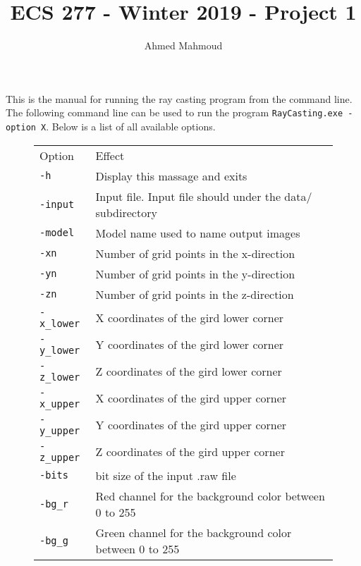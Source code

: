 \documentclass[12pt]{article}
\begin{document}
\title{ECS 277 - Winter 2019 - Project 1}
\author{Ahmed Mahmoud}
\date{} 

\maketitle

\newcommand{\cn}{Crank-Nicolson}

This is the manual for running the ray casting program from the command line. The following command line can be used to run the program  \texttt{RayCasting.exe -option X}. Below is a list of all available options. 
\vspace{5mm}

\begin{figure}[tbh]

  
\begin{tabular}{ |l| l|}
  \hline
  Option & Effect   \\ \hhline{|=|=|}
  \texttt{-h}  &  Display this massage and exits \\
  \texttt{-input}  &  Input file. Input file should under the \textsf{data/} subdirectory \\
  \texttt{-model}  &   Model name used to name output images \\
  \texttt{-xn}  &    Number of grid points in the x-direction \\
  \texttt{-yn}  &    Number of grid points in the y-direction \\
  \texttt{-zn}  &    Number of grid points in the z-direction \\
  \texttt{-x\_lower}  &     X coordinates of the gird lower corner \\
  \texttt{-y\_lower}  &     Y coordinates of the gird lower corner \\
  \texttt{-z\_lower}  &     Z coordinates of the gird lower corner \\
  \texttt{-x\_upper}  &      X coordinates of the gird upper corner \\  
  \texttt{-y\_upper}  &      Y coordinates of the gird upper corner \\  
  \texttt{-z\_upper}  &      Z coordinates of the gird upper corner \\  
  \texttt{-bits}  &      bit size of the input .raw file \\  
  \texttt{-bg\_r}  &      Red channel for the background color between 0 to 255 \\  
  \texttt{-bg\_g}  &      Green channel for the background color between 0 to 255 \\  

\end{tabular}
\end{figure}
\end{document}
